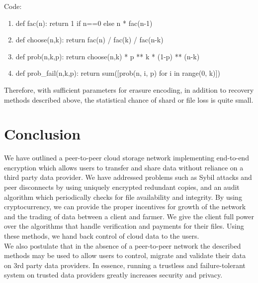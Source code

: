 \documentclass[a4paper,10pt]{article}
\begin{document}
Code:
\begin{enumerate}
\item def fac(n): return 1 if n==0 else n * fac(n-1)
\item def choose(n,k): return fac(n) / fac(k) / fac(n-k) 
\item def prob(n,k,p): return choose(n,k) * p ** k * (1-p) ** (n-k)
\item def prob\_fail(n,k,p): return sum([prob(n, i, p) for i in range(0, k)])
\end{enumerate}
Therefore, with sufficient parameters for erasure encoding, in addition to recovery methods described above, the statistical chance of shard or file loss is quite small. 


\section{Conclusion}
We have outlined a peer-to-peer cloud storage network implementing end-to-end encryption which allows users to transfer and share data without reliance on a third party data provider. We have addressed problems such as Sybil attacks and peer disconnects by using uniquely encrypted redundant copies, and an audit algorithm which periodically checks for file availability and integrity. By using cryptocurrency, we can provide the proper incentives for growth of the network and the trading of data between a client and farmer. We give the client full power over the algorithms that handle verification and payments for their files. Using these methods, we hand back control of cloud data to the users. \\

We also postulate that in the absence of a peer-to-peer network the described methods may be used to allow users to control, migrate and validate their data on 3rd party data providers. In essence, running a trustless and failure-tolerant system on trusted data providers greatly increases security and privacy.\\





\begingroup
  \raggedright
  
\endgroup
\end{document}
